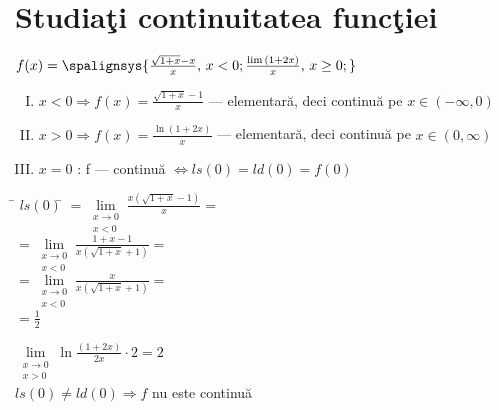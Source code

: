 \documentclass[a4paper, 12pt, notitlepage]{book}
\begin{document}
    \section{Studia\c{t}i continuitatea func\c{t}iei}
    $f(x) = \spalignsys{
      \frac{\sqrt{1+x} - x}{x} \text{,}\ x <0 ;
      \frac{\lim{(1+2x)}}{x} \text{,}\ x \ge 0;
    }$
    \begin{enumerate}[I. ]
            \item $x <0 \Rightarrow f(x) = \frac{\sqrt{1+x} - 1}{x}$ --- elementar\u{a}, deci continu\u{a} pe $x \in (-\infty, 0)$
            \item $x >0 \Rightarrow f(x) = \frac{\ln{(1+2x)}}{x}$ --- elementar\u{a}, deci continu\u{a} pe $x \in (0, \infty)$
            \item $x = 0$ : f --- continu\u{a} $\Leftrightarrow ls(0) = ld(0) = f(0)$
    \end{enumerate}
    \begin{tabbing}
      \= $ls(0)$\= $=\lim\limits_{\substack{x\to 0 \\ x<0}}\frac{x(\sqrt{1+x}-1)}{x}=$\\[2pt]
      \>  \> $= \lim\limits_{\substack{x\to 0 \\ x<0}}\frac{1+x-1}{x(\sqrt{1+x}+1)}=$\\[2pt]
      \>  \> $= \lim\limits_{\substack{x\to 0 \\ x<0}}\frac{x}{x(\sqrt{1+x}+1)}=$\\[2pt]
      \>  \> $= \frac{1}{2}$
   \end{tabbing}
   $\lim\limits_{\substack{x\to 0 \\ x>0}}\ln \frac{(1+2x)}{2x}\cdot 2 = 2$\\[5pt]
   $ls(0) \ne ld(0) \Rightarrow f$ nu este continu\u{a}
\end{document}

